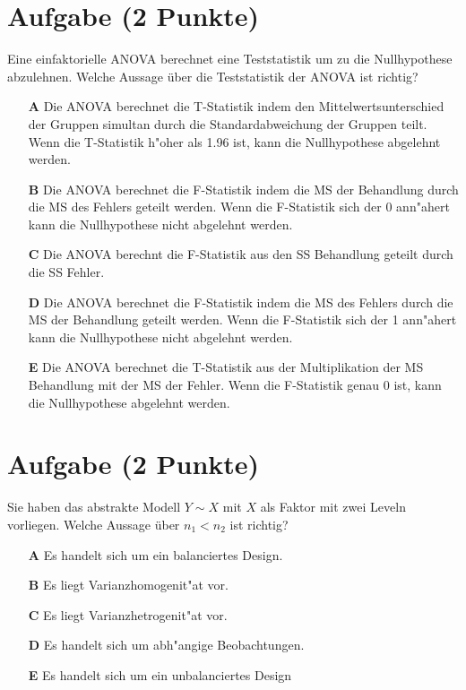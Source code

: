 \documentclass[a4paper, 10pt]{scrartcl}\usepackage[]{graphicx}\usepackage[]{xcolor}
\begin{document}
\section{Aufgabe \hfill (2 Punkte)}

Eine einfaktorielle ANOVA berechnet eine Teststatistik um zu die Nullhypothese abzulehnen. Welche Aussage {\"u}ber die Teststatistik der ANOVA ist richtig?



\begin{enumerate}
\item [\textbf{A} \msquare] Die ANOVA berechnet die T-Statistik indem den Mittelwertsunterschied der Gruppen simultan durch die Standardabweichung der Gruppen teilt. Wenn die T-Statistik h{"o}her als 1.96 ist, kann die Nullhypothese abgelehnt werden.
\item [\textbf{B} \msquare] Die ANOVA berechnet die F-Statistik indem die MS der Behandlung durch die MS des Fehlers geteilt werden. Wenn die F-Statistik sich der 0 ann{"a}hert kann die Nullhypothese nicht abgelehnt werden.
\item [\textbf{C} \msquare] Die ANOVA berechnt die F-Statistik aus den SS Behandlung geteilt durch die SS Fehler.
\item [\textbf{D} \msquare] Die ANOVA berechnet die F-Statistik indem die MS des Fehlers durch die MS der Behandlung geteilt werden. Wenn die F-Statistik sich der 1 ann{"a}hert kann die Nullhypothese nicht abgelehnt werden.
\item [\textbf{E} \msquare] Die ANOVA berechnet die T-Statistik aus der Multiplikation der MS Behandlung mit der MS der Fehler. Wenn die F-Statistik genau 0 ist, kann die Nullhypothese abgelehnt werden.
\end{enumerate} 

\section{Aufgabe \hfill (2 Punkte)}




Sie haben das abstrakte Modell $Y \sim X$ mit $X$ als Faktor mit zwei
Leveln vorliegen. Welche Aussage {\"u}ber $n_1 < n_2$ ist richtig?



\begin{enumerate}
\item [\textbf{A} \msquare] Es handelt sich um ein balanciertes Design.
\item [\textbf{B} \msquare] Es liegt Varianzhomogenit{"a}t vor.
\item [\textbf{C} \msquare] Es liegt Varianzhetrogenit{"a}t vor.
\item [\textbf{D} \msquare] Es handelt sich um abh{"a}ngige Beobachtungen.
\item [\textbf{E} \msquare] Es handelt sich um ein unbalanciertes Design
\end{enumerate} 
\end{document}
